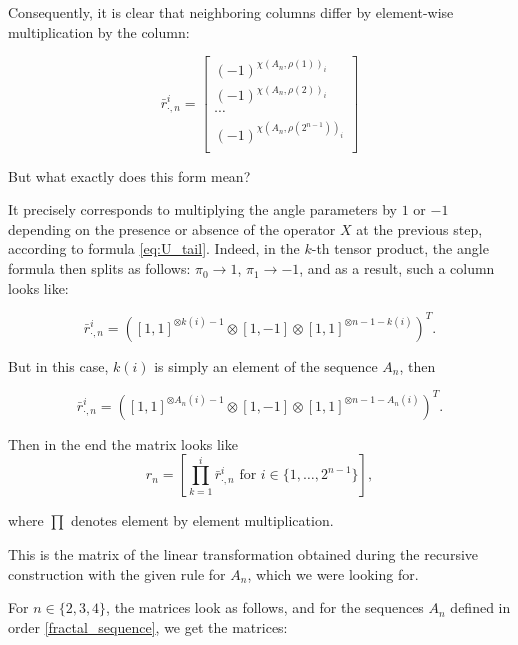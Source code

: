 \documentclass[a4paper, openany, 12pt]{article}
\theoremstyle{remark}
\theoremstyle{definition}
\newcommand{\ot}{\otimes}
\begin{document}
Consequently, it is clear that neighboring columns differ by element-wise multiplication by the column:

\begin{equation}
    \bar{r}^i_{\cdot,n} = \begin{bmatrix}
        (-1)^{\chi(A_n,\rho(1))_i}\\
        (-1)^{\chi(A_n,\rho(2))_i}\\
        \cdots \\
        (-1)^{\chi(A_n,\rho(2^{n-1}))_i}\\
    \end{bmatrix}
\end{equation}

But what exactly does this form mean?

It precisely corresponds to multiplying the angle parameters by $1$ or $-1$ depending on the presence or absence of the operator $X$ at the previous step, according to formula \eqref{eq:U_tail}. Indeed, in the $k$-th tensor product, the angle formula then splits as follows: $\pi_0 \rightarrow 1$, $\pi_1 \rightarrow -1$, and as a result, such a column looks like:


\begin{equation}
    \bar{r}^i_{\cdot,n} = ([1,1]^{\ot k(i)-1}\ot[1,-1]\ot[1,1]^{\ot n-1-k(i)})^T.
\end{equation}


But in this case, $k(i)$ is simply an element of the sequence $A_n$, then


\begin{equation}
    \bar{r}^i_{\cdot,n} = ([1,1]^{\ot A_n(i)-1}\ot[1,-1]\ot[1,1]^{\ot n-1-A_n(i)})^T.
\end{equation}

Then in the end the matrix looks like
\begin{equation}
r_n = \left[\prod_{k=1}^i \bar{r}^i_{\cdot,n} \text{ for } i\in\{1,\dots,2^{n-1}\}\right],
\end{equation}

where $\prod$ denotes element by element multiplication.

This is the matrix of the linear transformation obtained during the recursive construction with the given rule for $A_n$, which we were looking for.

For $n\in\{2, 3, 4\}$, the matrices look as follows, and for the sequences $A_n$ defined in order \eqref{fractal_sequence}, we get the matrices:
\end{document}

